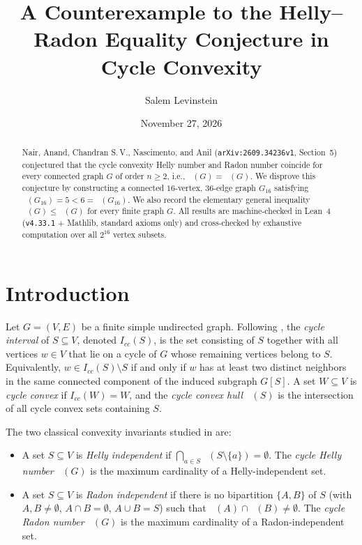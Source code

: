 \documentclass[11pt,a4paper]{article}
\title{A Counterexample to the Helly--Radon Equality Conjecture in Cycle Convexity}
\author{Salem Levinstein}
\date{November 27, 2026}
\DeclareMathOperator{\hl}{hl_{cc}}
\DeclareMathOperator{\rd}{rd_{cc}}
\DeclareMathOperator{\Hull}{Hull_{cc}}
\begin{document}
\maketitle

\begin{abstract}
Nair, Anand, Chandran S.\,V., Nascimento, and Anil (\texttt{arXiv:2609.34236v1}, Section~5) conjectured that the cycle convexity Helly number and Radon number coincide for every connected graph $G$ of order $n \ge 2$, i.e., $\hl(G) = \rd(G)$. We disprove this conjecture by constructing a connected $16$-vertex, $36$-edge graph $G_{16}$ satisfying $\hl(G_{16}) = 5 < 6 = \rd(G_{16})$. We also record the elementary general inequality $\hl(G) \le \rd(G)$ for every finite graph $G$. All results are machine-checked in Lean~4 (\texttt{v4.33.1} + Mathlib, standard axioms only) and cross-checked by exhaustive computation over all $2^{16}$ vertex subsets.
\end{abstract}

\section{Introduction}

Let $G = (V, E)$ be a finite simple undirected graph. Following \cite{Nair2026}, the \emph{cycle interval} of $S \subseteq V$, denoted $I_{cc}(S)$, is the set consisting of $S$ together with all vertices $w \in V$ that lie on a cycle of $G$ whose remaining vertices belong to $S$. Equivalently, $w \in I_{cc}(S) \setminus S$ if and only if $w$ has at least two distinct neighbors in the same connected component of the induced subgraph $G[S]$. A set $W \subseteq V$ is \emph{cycle convex} if $I_{cc}(W) = W$, and the \emph{cycle convex hull} $\Hull(S)$ is the intersection of all cycle convex sets containing $S$.

The two classical convexity invariants studied in \cite{Nair2026} are:
\begin{itemize}
\item A set $S \subseteq V$ is \emph{Helly independent} if $\bigcap_{a \in S} \Hull(S \setminus \{a\}) = \emptyset$. The \emph{cycle Helly number} $\hl(G)$ is the maximum cardinality of a Helly-independent set.
\item A set $S \subseteq V$ is \emph{Radon independent} if there is no bipartition $\{A, B\}$ of $S$ (with $A, B \neq \emptyset$, $A \cap B = \emptyset$, $A \cup B = S$) such that $\Hull(A) \cap \Hull(B) \neq \emptyset$. The \emph{cycle Radon number} $\rd(G)$ is the maximum cardinality of a Radon-independent set.
\end{itemize}
\end{document}
